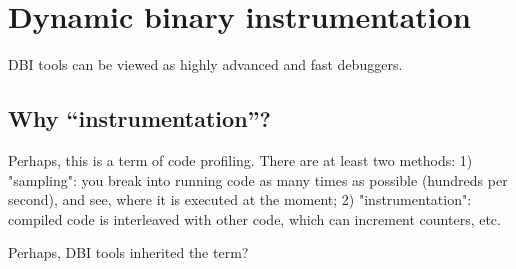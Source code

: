 \chapter{Dynamic binary instrumentation}

\ac{DBI} tools can be viewed as highly advanced and fast debuggers.





\section{Why ``instrumentation''?}

Perhaps, this is a term of code profiling.
There are at least two methods:
1) "sampling": you break into running code as many times as possible (hundreds per second), and see, where it is executed at the moment;
2) "instrumentation": compiled code is interleaved with other code, which can increment counters, etc.

Perhaps, \ac{DBI} tools inherited the term?


